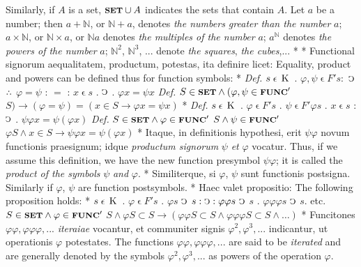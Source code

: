 \documentclass{book}
\newcommand{\C}{\mathop{\sbox0{$\displaystyle$$\reflectbox{C}$} %
\raisebox{-\height+\ht0-0.05cm}[\ht0][\dp0]{\scalebox{0.8}[0.8]{\copy0}}}\displaylimits} %
\newcommand{\pppNoSpace}{\leavevmode\lower0ex\hbox{.}\kern-0.1em\raise0.7ex\hbox{.}\kern-0.1em\lower0ex\hbox{.}} %
\newcommand{\smallIn}{\ensuremath{\mathrel{\epsilon}}}
\newcommand{\K}{\mathop{\thinspace \text{K} \thinspace}}
\newcommand{\setOfSets}{\mathord{\text{{\footnotesize \textbf{SET}}}}}
\newcommand{\func}{\mathord{\text{{\footnotesize \textbf{FUNC}}}}}
\newenvironment{translateTwoCol}
               { %
                 \columnratio{0.5, 0.5}
                 \begin{paracol}{2}
                 \newcommand{\LAT}{\switchcolumn[0]*}
                 \newcommand{\ENG}{\switchcolumn[1]}
               }
               { %
                 \let\ENG\undefined
                 \let\LAT\undefined
                 \end{paracol}
               }
\begin{document}
\begin{translateTwoCol}
\ENG
Similarly, if $A$ is a set, $\setOfSets \cup A$ indicates the sets that contain $A$. Let $a$ be a number; then $a + \mathbb{N}$, or $\mathbb{N} + a$, denotes \emph{the numbers greater than the number} $a$; $a \times \mathbb{N}$, or $\mathbb{N} \times a$, or $\mathbb{N} a$ denotes \emph{the multiples of the number} $a$; $a^\mathbb{N}$ denotes \emph{the powers of the number} $a$; $\mathbb{N}^2$, $\mathbb{N}^3$, ... denote \emph{the squares}, \emph{the cubes},...
\LAT
\hfill
\ENG
\hfill
\LAT
Functional signorum aequalitatem, productum, potestas, ita definire licet:
\ENG
Equality, product and powers can be defined thus for function symbols:
\LAT
\emph{Def.} \hspace{0.25cm} $s \smallIn \K$ . $\varphi, \psi \smallIn F' s :$ $\C$ $\pppNoSpace$ $\varphi = \psi$ : $=$ : $x \smallIn s$ . $\C$ . $\varphi x = \psi x$
\ENG
\emph{Def.} \hspace{0.25cm} $S \in \setOfSets \wedge (\varphi, \psi \in \func'$ $S) \rightarrow (\varphi = \psi) = (x \in S \rightarrow \varphi x = \psi x)$
\LAT
\emph{Def.} \hspace{0.25cm} $s \smallIn \K$ . $\varphi \smallIn F' s$ $.$ $\psi \smallIn F' \varphi s$ . $x \smallIn s$ : $\C$ . $\psi \varphi x = \psi (\varphi x)$
\ENG
\emph{Def.} \hspace{0.25cm} $S \in \setOfSets \wedge \varphi \in \func'$ $S \wedge \psi \in \func'$ $\varphi S \wedge x \in S \rightarrow \psi \varphi x = \psi (\varphi x)$
\LAT
Itaque, in definitionis hypothesi, erit $\psi \varphi$ novum functionis praesignum; idque \emph{productum signorum} $\psi$ \emph{et} $\varphi$ vocatur.
\ENG
Thus, if we assume this definition, we have the new function presymbol $\psi \varphi$; it is called the \emph{product of the symbols} $\psi$ \emph{and} $\varphi$.
\LAT
Similiterque, si $\varphi$, $\psi$ sunt functionis postsigna.
\ENG
Similarly if $\varphi$, $\psi$ are function postsymbols.
\LAT
Haec valet propositio:
\ENG
The following proposition holds:
\LAT
\hspace{1.06cm} $s \smallIn \K$ . $\varphi \smallIn F' s$ . $\varphi s$ $\C$ $s : \C : \varphi \varphi s$ $\C$ $s$ . $\varphi \varphi \varphi s$ $\C$ $s$. etc.
\ENG
\hspace{1.06cm} $S \in \setOfSets \wedge \varphi\in \func'$ $S \wedge \varphi S \subset S \rightarrow (\varphi \varphi S \subset S \wedge \varphi \varphi \varphi S \subset S \wedge \ldots)$ 
\LAT
Funcitones $\varphi \varphi, \varphi \varphi \varphi,...$ \emph{iteraiae} vocantur, et communiter signis $\varphi^2, \varphi^3,...$ indicantur, ut operationis $\varphi$ potestates.
\ENG
The functions $\varphi \varphi, \varphi \varphi \varphi,...$ are said to be \emph{iterated} and are generally denoted by the symbols $\varphi^2, \varphi^3,...$ as powers of the operation $\varphi$.
\end{translateTwoCol}
\end{document}
